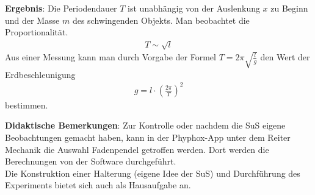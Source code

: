 \documentclass[../main.tex]{subfiles}
\begin{document}
\begin{tcolorbox}
    \vspace{0.5cm}
    \textbf{Ergebnis}: Die Periodendauer $T$ ist unabhängig von der Auslenkung $x$ zu Beginn und der Masse $m$ des schwingenden Objekts. Man beobachtet die Proportionalität.
    \begin{align*}
        T \sim \sqrt{l} 
    \end{align*}
    Aus einer Messung kann man durch Vorgabe der Formel $T=2 \pi \sqrt{\frac{l}{g}}$ den Wert der Erdbeschleunigung 
    \begin{align*}
        g = l \cdot \left(\frac{2\pi}{T}\right)^2
    \end{align*}
    bestimmen.


    \vspace{0.5cm}
    \textbf{Didaktische Bemerkungen}: Zur Kontrolle oder nachdem die SuS eigene Beobachtungen gemacht haben, kann in der Phyphox-App unter dem Reiter \glqq Mechanik\grqq{} die Auswahl \glqq Fadenpendel\grqq{} getroffen werden. Dort werden die Berechnungen von der Software durchgeführt.\\
    Die Konstruktion einer Halterung (eigene Idee der SuS) und Durchführung des Experiments bietet sich auch als Hausaufgabe an.

\end{tcolorbox}
\end{document}
